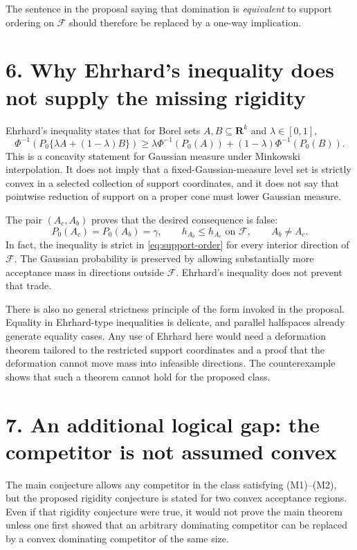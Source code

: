 \documentclass[12pt]{article}
\theoremstyle{definition}
\theoremstyle{remark}
\begin{document}
The sentence in the proposal saying that domination is \emph{equivalent} to support ordering on $\mathcal F$ should therefore be replaced by a one-way implication.

\section*{6. Why Ehrhard's inequality does not supply the missing rigidity}

Ehrhard's inequality states that for Borel sets $A,B\subseteq\mathbf R^k$ and $\lambda\in[0,1]$,
\[
\Phi^{-1}\!\left(P_0\{\lambda A+(1-\lambda)B\}\right)
\ge
\lambda\Phi^{-1}(P_0(A))
+(1-\lambda)\Phi^{-1}(P_0(B)).
\]
This is a concavity statement for Gaussian measure under Minkowski interpolation.  It does not imply that a fixed-Gaussian-measure level set is strictly convex in a selected collection of support coordinates, and it does not say that pointwise reduction of support on a proper cone must lower Gaussian measure.

The pair $(A_c,A_b)$ proves that the desired consequence is false:
\[
P_0(A_c)=P_0(A_b)=\gamma,
\qquad
h_{A_b}\le h_{A_c}\text{ on }\mathcal F,
\qquad
A_b\ne A_c.
\]
In fact, the inequality is strict in \eqref{eq:support-order} for every interior direction of $\mathcal F$.  The Gaussian probability is preserved by allowing substantially more acceptance mass in directions outside $\mathcal F$.  Ehrhard's inequality does not prevent that trade.

There is also no general strictness principle of the form invoked in the proposal.  Equality in Ehrhard-type inequalities is delicate, and parallel halfspaces already generate equality cases.  Any use of Ehrhard here would need a deformation theorem tailored to the restricted support coordinates and a proof that the deformation cannot move mass into infeasible directions.  The counterexample shows that such a theorem cannot hold for the proposed class.

\section*{7. An additional logical gap: the competitor is not assumed convex}

The main conjecture allows any competitor in the class satisfying (M1)--(M2), but the proposed rigidity conjecture is stated for two convex acceptance regions.  Even if that rigidity conjecture were true, it would not prove the main theorem unless one first showed that an arbitrary dominating competitor can be replaced by a convex dominating competitor of the same size.
\end{document}
